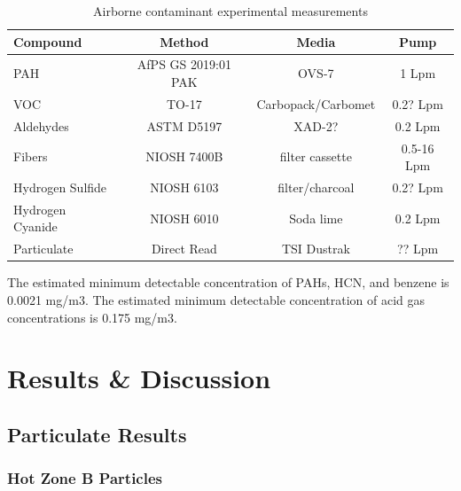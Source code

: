\documentclass[12pt,oneside]{book}
\begin{document}
\begin{table}[!ht]
	\centering
	\caption{Airborne contaminant experimental measurements}
	\begin{tabular}{lccc}
		\toprule[1.5pt]
		Compound & Method & Media & Pump \\
		\midrule
		PAH   				& AfPS GS 2019:01 PAK   & OVS-7     		& 1 Lpm     \\
		VOC    				& TO-17     			& Carbopack/Carbomet& 0.2? Lpm    \\
		Aldehydes   	 	& ASTM D5197		    & XAD-2?   			& 0.2 Lpm    \\
		Fibers    			& NIOSH 7400B      		& filter cassette 	& 0.5-16 Lpm   \\
		Hydrogen Sulfide  	& NIOSH 6103		    & filter/charcoal	& 0.2? Lpm     \\
		Hydrogen Cyanide   	& NIOSH 6010		    & Soda lime			& 0.2 Lpm    \\
		Particulate   		& Direct Read     		& TSI Dustrak 		& ?? Lpm    \\
		\bottomrule[1.25pt]
	\end{tabular}
\end{table}
The estimated minimum detectable concentration of PAHs, HCN, and benzene  is  0.0021 mg/m3.
The estimated minimum detectable concentration of acid gas concentrations is 0.175 mg/m3.




\chapter{Results \& Discussion}
\section{Particulate Results}
\label{sec:particle}


\subsection{Hot Zone B Particles}
\label{subsec:HZAparticle}
\end{document}
